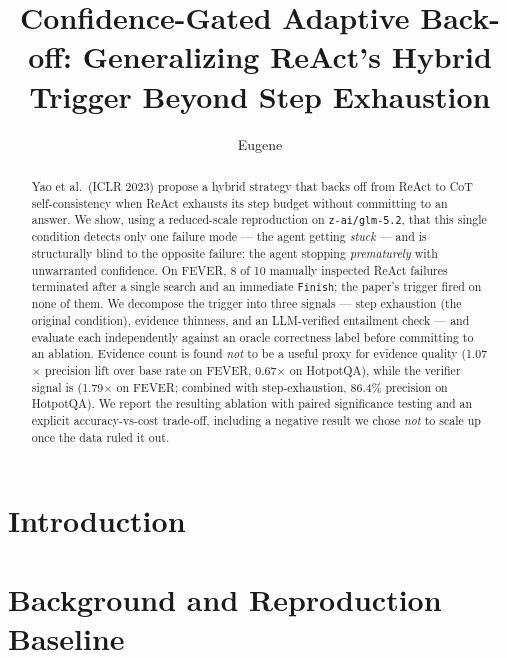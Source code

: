 \documentclass[sigconf,nonacm]{acmart}
\begin{document}
\title{Confidence-Gated Adaptive Back-off: Generalizing ReAct's Hybrid
Trigger Beyond Step Exhaustion}

\author{Eugene}
\email{}

\begin{abstract}
Yao et al.\ (ICLR 2023) propose a hybrid strategy that backs off from ReAct
to CoT self-consistency when ReAct exhausts its step budget without
committing to an answer. We show, using a reduced-scale reproduction on
\texttt{z-ai/glm-5.2}, that this single condition detects only one failure
mode --- the agent getting \emph{stuck} --- and is structurally blind to the
opposite failure: the agent stopping \emph{prematurely} with unwarranted
confidence. On FEVER, 8 of 10 manually inspected ReAct failures terminated
after a single search and an immediate \texttt{Finish}; the paper's trigger
fired on none of them. We decompose the trigger into three signals ---
step exhaustion (the original condition), evidence thinness, and an
LLM-verified entailment check --- and evaluate each independently against
an oracle correctness label before committing to an ablation. Evidence
count is found \emph{not} to be a useful proxy for evidence quality
(1.07$\times$ precision lift over base rate on FEVER, 0.67$\times$ on
HotpotQA), while the verifier signal is (1.79$\times$ on FEVER; combined
with step-exhaustion, 86.4\% precision on HotpotQA). We report the
resulting ablation with paired significance testing and an explicit
accuracy-vs-cost trade-off, including a negative result we chose \emph{not}
to scale up once the data ruled it out.
\end{abstract}

\maketitle

\section{Introduction}


\section{Background and Reproduction Baseline}

\end{document}
